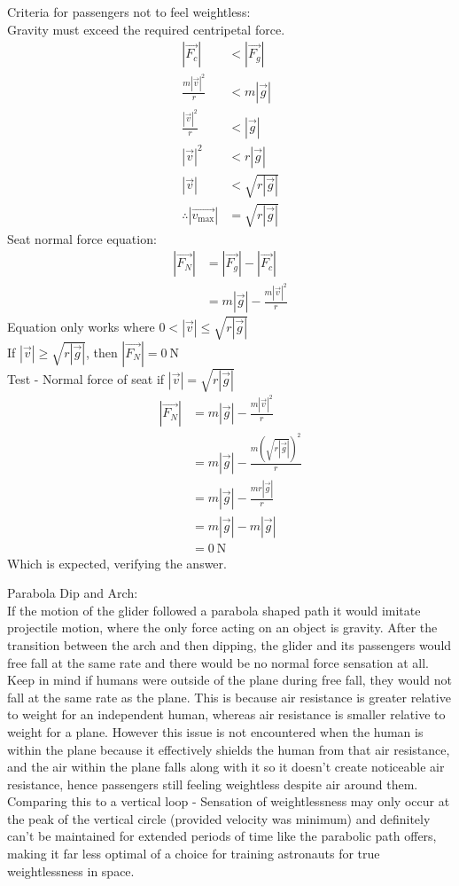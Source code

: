 \documentclass[11pt, a4paper]{article}
\def\ParagraphSpacing{30pt}
\begin{document}
	\begin{center}
		Criteria for passengers not to feel weightless:\\
		Gravity must exceed the required centripetal force.
		\begin{align}
		|\vec{F_c}| &< |\vec{F_g}|\\
		\frac{m|\vec{v}|^2}{r} &< m|\vec{g}|\\
		\frac{|\vec{v}|^2}{r} &< |\vec{g}|\\
		|\vec{v}|^2&<r|\vec{g}|\\
		|\vec{v}|&<\sqrt{r|\vec{g}|}\\
		\therefore |\vec{v_\text{max}}|&=\sqrt{r|\vec{g}|}
		\end{align}
		Seat normal force equation:
		\begin{align}
			|\vec{F_N}|&=|\vec{F_g}|-|\vec{F_c}|\\
			&=m|\vec{g}|-\frac{m|\vec{v}|^2}{r}
		\end{align}
		Equation only works where $0<|\vec{v}|\leq\sqrt{r|\vec{g}|}$\\
		If $|\vec{v}|\geq\sqrt{r|\vec{g}|}$, then $|\vec{F_N}|=\SI{0}{\newton}$\\[\baselineskip]
		Test - Normal force of seat if $|\vec{v}|=\sqrt{r|\vec{g}|}$
		\begin{align}
			|\vec{F_N}|&=m|\vec{g}|-\frac{m|\vec{v}|^2}{r}\\
			&=m|\vec{g}|-\frac{m\left(\sqrt{r|\vec{g}|}\right)^2}{r}\\
			&=m|\vec{g}|-\frac{mr|\vec{g}|}{r}\\
			&=m|\vec{g}|-m|\vec{g}|\\
			&=\SI{0}{\newton}
		\end{align}
		Which is expected, verifying the answer.
	\end{center}
	\vspace{\ParagraphSpacing}
	\Large Parabola Dip and Arch:\\ \normalsize
	If the motion of the glider followed a parabola shaped path it would imitate projectile motion, where the only force acting on an object is gravity. After the transition between the arch and then dipping, the glider and its passengers would free fall at the same rate and there would be no normal force sensation at all.\\
	Keep in mind if humans were outside of the plane during free fall, they would not fall at the same rate as the plane. This is because air resistance is greater relative to weight for an independent human, whereas air resistance is smaller relative to weight for a plane. However this issue is not encountered when the human is within the plane because it effectively shields the human from that air resistance, and the air within the plane falls along with it so it doesn't create noticeable air resistance, hence passengers still feeling weightless despite air around them.\\
	Comparing this to a vertical loop - Sensation of weightlessness may only occur at the peak of the vertical circle (provided velocity was minimum) and definitely can't be maintained for extended periods of time like the parabolic path offers, making it far less optimal of a choice for training astronauts for true weightlessness in space.
\end{document}
